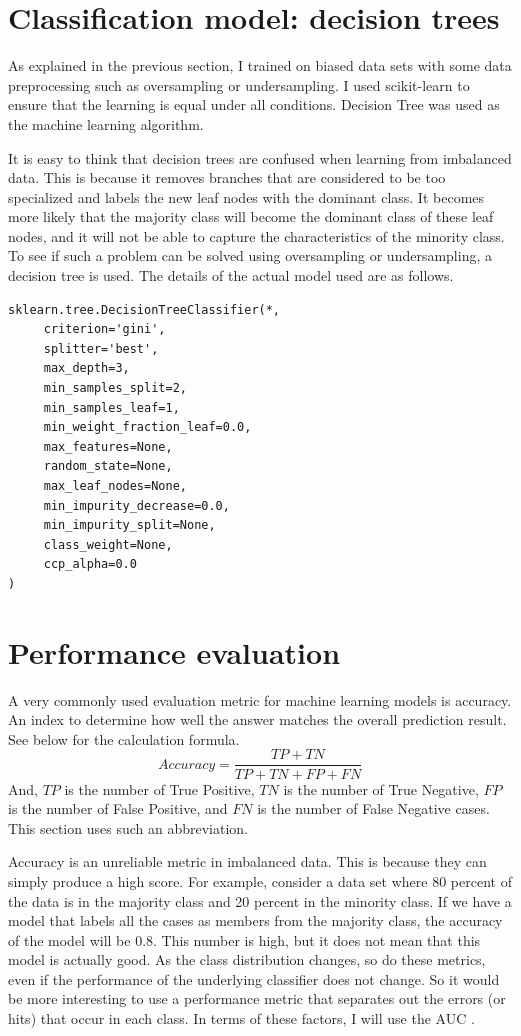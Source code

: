 \section{Classification model: decision trees}
As explained in the previous section, I trained on biased data sets with some data preprocessing such as oversampling or undersampling. I used scikit-learn to ensure that the learning is equal under all conditions. Decision Tree was used as the machine learning algorithm. 

It is easy to think that decision trees are confused when learning from imbalanced data. This is because it removes branches that are considered to be too specialized and labels the new leaf nodes with the dominant class. It becomes more likely that the majority class will become the dominant class of these leaf nodes, and it will not be able to capture the characteristics of the minority class. To see if such a problem can be solved using oversampling or undersampling, a decision tree is used. The details of the actual model used are as follows. 

\begin{lstlisting}[caption=DecisionTreeClassifier,label=DecisionTreeClassifier]
sklearn.tree.DecisionTreeClassifier(*,
     criterion='gini',
     splitter='best',
     max_depth=3,
     min_samples_split=2,
     min_samples_leaf=1,
     min_weight_fraction_leaf=0.0,
     max_features=None,
     random_state=None,
     max_leaf_nodes=None,
     min_impurity_decrease=0.0,
     min_impurity_split=None,
     class_weight=None,
     ccp_alpha=0.0
)
\end{lstlisting}

\section{Performance evaluation}
A very commonly used evaluation metric for machine learning models is accuracy.
An index to determine how well the answer matches the overall prediction result. See below for the calculation formula.
$$
Accuracy = \frac{TP + TN}{TP + TN + FP + FN}
$$
And, $TP$ is the number of True Positive, $TN$ is the number of True Negative, $FP$ is the number of False Positive, and $FN$ is the number of False Negative cases. This section uses such an abbreviation.

Accuracy is an unreliable metric in imbalanced data. This is because they can simply produce a high score. For example, consider a data set where 80 percent of the data is in the majority class and 20 percent in the minority class. If we have a model that labels all the cases as members from the majority class, the accuracy of the model will be 0.8. This number is high, but it does not mean that this model is actually good. As the class distribution changes, so do these metrics, even if the performance of the underlying classifier does not change. So it would be more interesting to use a performance metric that separates out the errors (or hits) that occur in each class.
In terms of these factors, I will use the AUC \cite{ROC}. 


